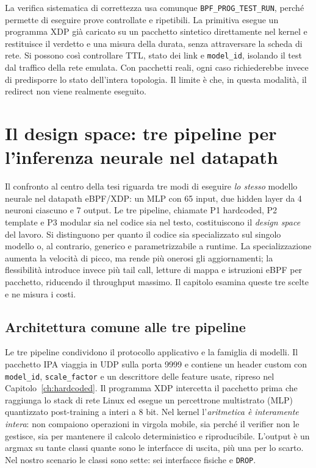 \documentclass[binding=0.6cm,italian,oneside,noexaminfo]{sapthesis}
\begin{document}
La verifica sistematica di correttezza usa comunque \texttt{BPF\_PROG\_TEST\_RUN}, perché permette di eseguire prove controllate e ripetibili. La primitiva esegue un programma XDP già caricato su un pacchetto sintetico direttamente nel kernel e restituisce il verdetto e una misura della durata, senza attraversare la scheda di rete. Si possono così controllare TTL, stato dei link e \texttt{model\_id}, isolando il test dal traffico della rete emulata. Con pacchetti reali, ogni caso richiederebbe invece di predisporre lo stato dell'intera topologia. Il limite è che, in questa modalità, il redirect non viene realmente eseguito.

\chapter{Il design space: tre pipeline per l'inferenza neurale nel datapath}
\label{ch:designspace}

Il confronto al centro della tesi riguarda tre modi di eseguire \emph{lo stesso} modello neurale nel datapath eBPF/XDP: un MLP con 65 input, due hidden layer da 4 neuroni ciascuno e 7 output. Le tre pipeline, chiamate P1 hardcoded, P2 template e P3 modular sia nel codice sia nel testo, costituiscono il \emph{design space} del lavoro. Si distinguono per quanto il codice sia specializzato sul singolo modello o, al contrario, generico e parametrizzabile a runtime. La specializzazione aumenta la velocità di picco, ma rende più onerosi gli aggiornamenti; la flessibilità introduce invece più tail call, letture di mappa e istruzioni eBPF per pacchetto, riducendo il throughput massimo. Il capitolo esamina queste tre scelte e ne misura i costi.

\section{Architettura comune alle tre pipeline}
\label{sec:common}

Le tre pipeline condividono il protocollo applicativo e la famiglia di modelli. Il pacchetto IPA viaggia in UDP sulla porta 9999 e contiene un header custom con \texttt{model\_id}, \texttt{scale\_factor} e un descrittore delle feature usate, ripreso nel Capitolo~\ref{ch:hardcoded}. Il programma XDP intercetta il pacchetto prima che raggiunga lo stack di rete Linux ed esegue un percettrone multistrato (MLP) quantizzato post-training a interi a 8 bit. Nel kernel l'\emph{aritmetica è interamente intera}: non compaiono operazioni in virgola mobile, sia perché il verifier non le gestisce, sia per mantenere il calcolo deterministico e riproducibile. L'output è un argmax su tante classi quante sono le interfacce di uscita, più una per lo scarto. Nel nostro scenario le classi sono sette: sei interfacce fisiche e \texttt{DROP}.
\end{document}

